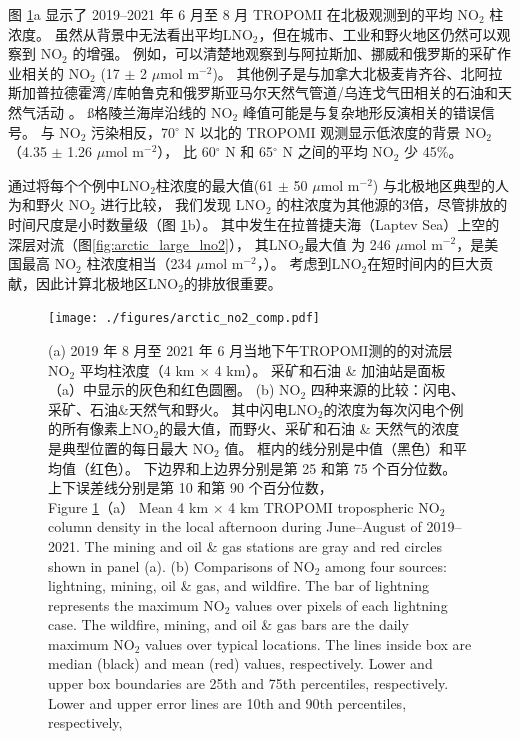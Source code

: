 图 \ref{fig:arctic_no2_comp}a 显示了 2019--2021 年 6 月至 8 月 TROPOMI 在北极观测到的平均 NO$_2$ 柱浓度。
虽然从背景中无法看出平均LNO$_2$，但在城市、工业和野火地区仍然可以观察到 NO$_2$ 的增强。
例如，可以清楚地观察到与阿拉斯加、挪威和俄罗斯的采矿作业相关的 NO$_2$ (17 $\pm$ 2 $\mu$mol m$^{-2}$)。
其他例子是与加拿大北极麦肯齐谷、北阿拉斯加普拉德霍湾/库帕鲁克和俄罗斯亚马尔天然气管道/乌连戈气田相关的石油和天然气活动 \citep{VanDerA.2020}。
ß格陵兰海岸沿线的 NO$_2$ 峰值可能是与复杂地形反演相关的错误信号\citep{Hachmeister.2022}。
与 NO$_2$ 污染相反，70$^{\circ}$ N 以北的 TROPOMI 观测显示低浓度的背景 NO$_2$（4.35 $\pm$ 1.26 $\mu$mol m$^{-2}$），
比 60$^{\circ}$ N 和 65$^{\circ}$ N 之间的平均 NO$_2$ 少 45\%。

通过将每个个例中LNO$_2$柱浓度的最大值(61 $\pm$ 50 $\mu$mol m$^{-2}$) 与北极地区典型的人为和野火 NO$_2$ 进行比较，
我们发现 LNO$_2$ 的柱浓度为其他源的3倍，尽管排放的时间尺度是小时数量级（图 \ref{fig:arctic_no2_comp}b）。
其中发生在拉普捷夫海（Laptev Sea）上空的深层对流（图\ref{fig:arctic_large_lno2}），
其LNO$_2$最大值 为 246 $\mu$mol m$^{-2}$，是美国最高 NO$_2$ 柱浓度相当（234 $\mu$mol m$^{-2}$，\citet{Goldberg.2021a}）。
考虑到LNO$_2$在短时间内的巨大贡献，因此计算北极地区LNO$_2$的排放很重要。

\begin{figure}[!htbp]
\centering
\texttt{[image: ./figures/arctic\_no2\_comp.pdf]}
\caption{
(a) 2019 年 8 月至 2021 年 6 月当地下午TROPOMI测的的对流层 NO$_2$ 平均柱浓度（4 km $\times$ 4 km）。
采矿和石油 \& 加油站是面板（a）中显示的灰色和红色圆圈。
(b) NO$_2$ 四种来源的比较：闪电、采矿、石油\&天然气和野火。
其中闪电LNO$_2$的浓度为每次闪电个例的所有像素上NO$_2$的最大值，而野火、采矿和石油 \& 天然气的浓度是典型位置的每日最大 NO$_2$ 值。
框内的线分别是中值（黑色）和平均值（红色）。
下边界和上边界分别是第 25 和第 75 个百分位数。
上下误差线分别是第 10 和第 90 个百分位数，\\
Figure \ref{fig:arctic_no2_comp}（a） Mean 4 km $\times$ 4 km TROPOMI tropospheric NO$_2$ column density in the local afternoon during June--August of 2019--2021.
The mining and oil \& gas stations are gray and red circles shown in panel (a).
(b) Comparisons of NO$_2$ among four sources: lightning, mining, oil \& gas, and wildfire.
The bar of lightning represents the maximum NO$_2$ values over pixels of each lightning case.
The wildfire, mining, and oil \& gas bars are the daily maximum NO$_2$ values over typical locations.
The lines inside box are median (black) and mean (red) values, respectively.
Lower and upper box boundaries are 25th and 75th percentiles, respectively.
Lower and upper error lines are 10th and 90th percentiles, respectively,
}
\label{fig:arctic_no2_comp}
\end{figure}


